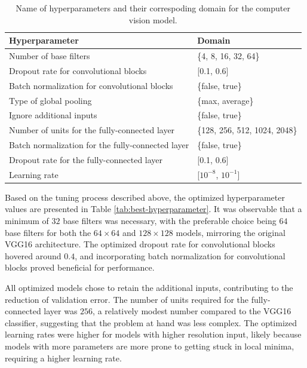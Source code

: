 \documentclass[]{interact}
\theoremstyle{plain}%
\theoremstyle{definition}
\theoremstyle{remark}
\begin{document}
\begin{table}

\caption{\label{tab:hyperparameter}Name of hyperparameters and their correspoding domain for the computer vision model.}
\centering
\begin{tabular}[t]{ll}
\toprule
Hyperparameter & Domain\\
\midrule
Number of base filters & \{4, 8, 16, 32, 64\}\\
Dropout rate for convolutional blocks & {}[0.1, 0.6]\\
Batch normalization for convolutional blocks & \{false, true\}\\
Type of global pooling & \{max, average\}\\
Ignore additional inputs & \{false, true\}\\
\addlinespace
Number of units for the fully-connected layer & \{128, 256, 512, 1024, 2048\}\\
Batch normalization for the fully-connected layer & \{false, true\}\\
Dropout rate for the fully-connected layer & {}[0.1, 0.6]\\
Learning rate & {}[$10^{-8}$, $10^{-1}$]\\
\bottomrule
\end{tabular}
\end{table}

Based on the tuning process described above, the optimized
hyperparameter values are presented in Table
\ref{tab:best-hyperparameter}. It was observable that a minimum of
\(32\) base filters was necessary, with the preferable choice being
\(64\) base filters for both the \(64 \times 64\) and \(128 \times 128\)
models, mirroring the original VGG16 architecture. The optimized dropout
rate for convolutional blocks hovered around \(0.4\), and incorporating
batch normalization for convolutional blocks proved beneficial for
performance.

All optimized models chose to retain the additional inputs, contributing
to the reduction of validation error. The number of units required for
the fully-connected layer was \(256\), a relatively modest number
compared to the VGG16 classifier, suggesting that the problem at hand
was less complex. The optimized learning rates were higher for models
with higher resolution input, likely because models with more parameters
are more prone to getting stuck in local minima, requiring a higher
learning rate.
\end{document}
